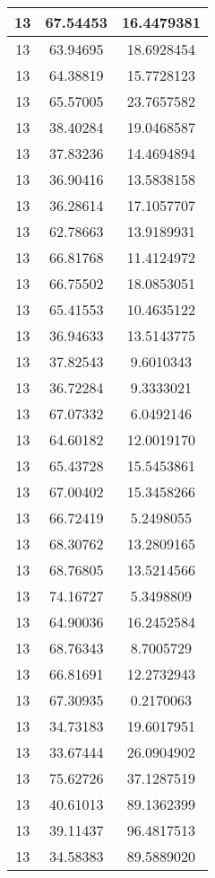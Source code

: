 \documentclass[
]{book}
\begin{document}
\begin{tabular}{c|c|c}
\hline
13 & 67.54453 & 16.4479381\\
\hline
13 & 63.94695 & 18.6928454\\
\hline
13 & 64.38819 & 15.7728123\\
\hline
13 & 65.57005 & 23.7657582\\
\hline
13 & 38.40284 & 19.0468587\\
\hline
13 & 37.83236 & 14.4694894\\
\hline
13 & 36.90416 & 13.5838158\\
\hline
13 & 36.28614 & 17.1057707\\
\hline
13 & 62.78663 & 13.9189931\\
\hline
13 & 66.81768 & 11.4124972\\
\hline
13 & 66.75502 & 18.0853051\\
\hline
13 & 65.41553 & 10.4635122\\
\hline
13 & 36.94633 & 13.5143775\\
\hline
13 & 37.82543 & 9.6010343\\
\hline
13 & 36.72284 & 9.3333021\\
\hline
13 & 67.07332 & 6.0492146\\
\hline
13 & 64.60182 & 12.0019170\\
\hline
13 & 65.43728 & 15.5453861\\
\hline
13 & 67.00402 & 15.3458266\\
\hline
13 & 66.72419 & 5.2498055\\
\hline
13 & 68.30762 & 13.2809165\\
\hline
13 & 68.76805 & 13.5214566\\
\hline
13 & 74.16727 & 5.3498809\\
\hline
13 & 64.90036 & 16.2452584\\
\hline
13 & 68.76343 & 8.7005729\\
\hline
13 & 66.81691 & 12.2732943\\
\hline
13 & 67.30935 & 0.2170063\\
\hline
13 & 34.73183 & 19.6017951\\
\hline
13 & 33.67444 & 26.0904902\\
\hline
13 & 75.62726 & 37.1287519\\
\hline
13 & 40.61013 & 89.1362399\\
\hline
13 & 39.11437 & 96.4817513\\
\hline
13 & 34.58383 & 89.5889020\\
\hline
\end{tabular}
\end{document}
